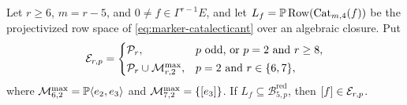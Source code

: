 \begin{proposition}
\label{prop:trapped-row-space}%
%
%
%
Let \(r\geq6\), \(m=r-5\), and \(0\ne f\in\Gamma^{r-1}E\), and let
\(L_f=\mathbb P\operatorname{Row}(\operatorname{Cat}_{m,4}(f))\) be the
projectivized row space of \eqref{eq:marker-catalecticant} over an algebraic
closure.  Put
\begin{equation}\label{eq:exceptional-locus}
 \mathcal E_{r,p}=
 \begin{cases}
  \mathcal P_r, & p\ \text{odd, or } p=2 \text{ and } r\geq8,\\[2pt]
  \mathcal P_r\cup\mathcal M^{\max}_{r,2}, & p=2 \text{ and } r\in\{6,7\},
 \end{cases}
\end{equation}
where \(\mathcal M^{\max}_{6,2}=\mathbb P\langle e_2,e_3\rangle\) and
\(\mathcal M^{\max}_{7,2}=\{[e_3]\}\).  If
\(L_f\subseteq\mathcal B^{\mathrm{red}}_{5,p}\), then \([f]\in\mathcal E_{r,p}\).
\end{proposition}

